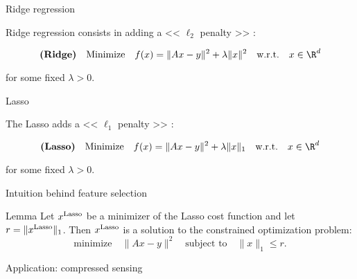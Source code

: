 \documentclass{beamer}
\begin{document}
\begin{frame}[t]{Ridge regression}
	\grid

	\vspace{-0.2cm}
	Ridge regression consists in adding a << $\ell_2$ penalty >> :
	\vspace{-0.5cm}
	\begin{exampleblock}
		$$
		\textbf{(Ridge)} \quad \text{Minimize} \quad f(x) = \| Ax - y \|^2 + \lambda \|x\|^2 \quad \text{w.r.t.} \quad x \in \R^d
		$$
	\end{exampleblock}
	for some fixed $\lambda > 0$.

\end{frame}

\begin{frame}[t]{Lasso}
	\grid

	\vspace{-0.2cm}
	The Lasso adds a << $\ell_1$ penalty >> :
	\vspace{-0.5cm}
	\begin{exampleblock}
		$$
		\textbf{(Lasso)} \quad \text{Minimize} \quad f(x) = \| Ax - y \|^2 + \lambda \|x\|_1 \quad \text{w.r.t.} \quad x \in \R^d
		$$
	\end{exampleblock}
	for some fixed $\lambda > 0$.

\end{frame}

\begin{frame}[t]{Intuition behind feature selection}
	\grid

	\vspace{-0.4cm}
	\begin{block}{Lemma}
		Let $x^{\rm Lasso}$ be a minimizer of the Lasso cost function and let $r=\|x^{\rm Lasso}\|_1$. Then $x^{\rm Lasso}$ is a solution to the constrained optimization problem:
		$$
		\text{minimize} \quad \|Ax-y\|^2 \quad
		\text{subject to} \quad \|x\|_1 \leq r.
		$$
	\end{block}

\end{frame}

\begin{frame}[t]{Application: compressed sensing}
	\grid

	\pause

\end{frame}
\end{document}
